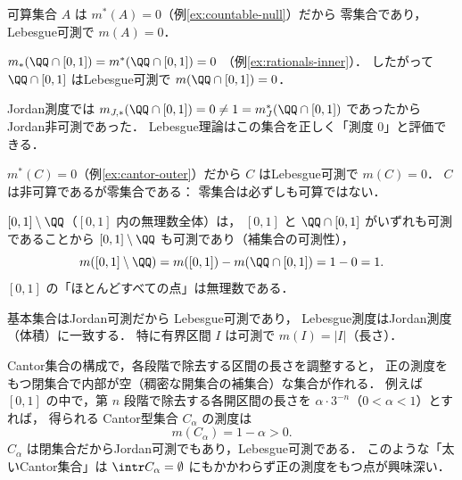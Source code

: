 \begin{example}[可算集合]\label{ex:countable-measurable}
可算集合 $A$ は $m^*(A) = 0$（例\ref{ex:countable-null}）だから
零集合であり，Lebesgue可測で $m(A) = 0$．
\end{example}

\begin{example}[{$\QQ \cap [0,1]$}]\label{ex:rationals-measurable}
$m_*(\QQ \cap [0,1]) = m^*(\QQ \cap [0,1]) = 0$
（例\ref{ex:rationals-inner}）．
したがって $\QQ \cap [0,1]$ はLebesgue可測で $m(\QQ \cap [0,1]) = 0$．

Jordan測度では $m_{J,*}(\QQ \cap [0,1]) = 0 \neq 1 = m_J^*(\QQ \cap [0,1])$
であったからJordan非可測であった．
Lebesgue理論はこの集合を正しく「測度 $0$」と評価できる．
\end{example}

\begin{example}[Cantor集合]\label{ex:cantor-measurable}
$m^*(C) = 0$（例\ref{ex:cantor-outer}）だから
$C$ はLebesgue可測で $m(C) = 0$．
$C$ は非可算であるが零集合である：
零集合は必ずしも可算ではない．
\end{example}

\begin{example}[無理数の集合]\label{ex:irrationals-measurable}
$[0,1] \setminus \QQ$（$[0,1]$ 内の無理数全体）は，
$[0,1]$ と $\QQ \cap [0,1]$ がいずれも可測であることから
$[0,1] \setminus \QQ$ も可測であり（補集合の可測性），
\[
m([0,1] \setminus \QQ) = m([0,1]) - m(\QQ \cap [0,1]) = 1 - 0 = 1.
\]
$[0,1]$ の「ほとんどすべての点」は無理数である．
\end{example}

\begin{example}[基本集合・区間]\label{ex:elementary-measurable}
基本集合はJordan可測だから Lebesgue可測であり，
Lebesgue測度はJordan測度（体積）に一致する．
特に有界区間 $I$ は可測で $m(I) = |I|$（長さ）．
\end{example}

\begin{example}[太いCantor集合]\label{ex:fat-cantor}
Cantor集合の構成で，各段階で除去する区間の長さを調整すると，
正の測度をもつ閉集合で内部が空（稠密な開集合の補集合）な集合が作れる．
例えば $[0,1]$ の中で，第 $n$ 段階で除去する各開区間の長さを
$\alpha \cdot 3^{-n}$（$0 < \alpha < 1$）とすれば，
得られる Cantor型集合 $C_\alpha$ の測度は
\[
m(C_\alpha) = 1 - \alpha > 0.
\]
$C_\alpha$ は閉集合だからJordan可測でもあり，Lebesgue可測である．
このような「太いCantor集合」は $\intr C_\alpha = \emptyset$
にもかかわらず正の測度をもつ点が興味深い．
\end{example}

